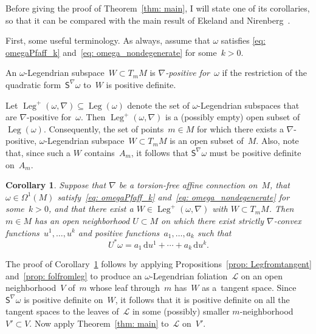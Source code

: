 \documentclass[pdftex]{sigma}
\renewcommand{\d}{\mathrm{d}}%
\newcommand{\cL}{{\mathcal L}}
\newcommand{\Leg}{\operatorname{Leg}}
\newcommand{\Ss}{\mathsf{S}}
\numberwithin{equation}{section}
\newtheorem{Corollary}[Theorem]{Corollary}
\begin{document}
Before giving the proof of Theorem~\ref{thm: main},
I will state one of its corollaries, so that it can be compared
with the main result of Ekeland and Nirenberg~\cite[Theorem 1]{MR2023129}.

First, some useful terminology.
As always, assume that $\omega$ satisfies
\eqref{eq: omegaPfaff_k} and~\eqref{eq: omega_nondegenerate} for some~${k>0}$.

\begin{Definition} An $\omega$-Legendrian subspace~$W\subset T_mM$
is \emph{$\nabla$-positive for~$\omega$}
if the restriction of the quadratic form~$\Ss^\nabla\omega$ to~$W$
is positive definite.
\end{Definition}

Let $\Leg^+(\omega,\nabla)\subseteq\Leg(\omega)$
denote the set of $\omega$-Legendrian subspaces
that are $\nabla$-positive for~$\omega$.
Then $\Leg^+(\omega,\nabla)$ is a (possibly empty) open subset
of~$\Leg(\omega)$. Consequently, the set of points~$m\in M$
for which there exists a $\nabla$-positive, $\omega$-Legendrian
subspace~$W\subset T_mM$ is an open subset of~$M$.
Also, note that, since such a $W$ contains~$A_m$,
it follows that $\Ss^\nabla\omega$ must be positive definite on~$A_m$.



\begin{Corollary}\label{cor: main}
Suppose that $\nabla$ be a torsion-free affine
connection on~$M$, that $\omega\in\Omega^1(M)$
satisfy~\eqref{eq: omegaPfaff_k} and~\eqref{eq: omega_nondegenerate}
for some~$k>0$, and that there exist a $W\in\Leg^+(\omega,\nabla)$
with ${W\subset T_mM}$. Then $m\in M$ has an open neighborhood ${U\subset M}$
on which there exist strictly $\nabla$-convex functions~$u^1,\ldots,u^k$
and positive functions~$a_1,\ldots,a_k$ such that
\begin{equation*}
U^*\omega = a_1\,\d u^1 + \cdots + a_k\,\d u^k.
\end{equation*}
\end{Corollary}

The proof of Corollary~\ref{cor: main} follows
by applying Propositions~\ref{prop: Legfromtangent}
and~\ref{prop: folfromleg} to produce an $\omega$-Legendrian foliation~$\cL$
on an open neighborhood~$V$ of~$m$ whose leaf through~$m$ has~$W$
as a~tangent space. Since $\Ss^\nabla\omega$ is positive definite on~$W$,
it follows that it is positive definite on all the tangent spaces
to the leaves of~$\cL$
in some (possibly) smaller $m$-neighborhood~$V'\subset V$.
Now apply Theorem~\ref{thm: main} to~$\cL$ on~$V'$.
\end{document}
